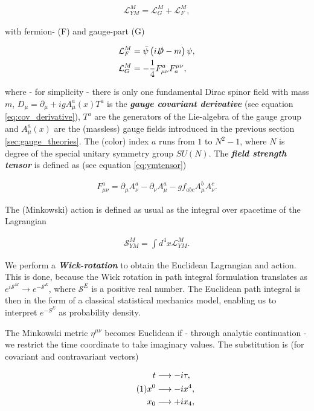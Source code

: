 \documentclass{article}
\newcommand\numberthis{\addtocounter{equation}{1}\tag{\theequation}}
\theoremstyle{plain} %
\theoremstyle{convention} %
\theoremstyle{remark} %
\def\df#1{\textbf{\textit{#1}}}
\numberwithin{equation}{section}
\begin{document}
\begin{align}
    \mathcal{L}_{YM}^M = \mathcal{L}_G^M + \mathcal{L}_F^M, \label{eq:cont_ym_lagrangian}
\end{align}

with fermion- (F) and gauge-part (G)

\begin{align*}
    \mathcal{L}_F^M &= \bar{\psi} \left( i \slashed{D} - m \right) \psi, \\
    \mathcal{L}_G^M &= - \frac{1}{4} F_{\mu \nu}^a F_a^{\mu \nu},
\end{align*}

where - for simplicity - there is only one fundamental Dirac spinor field with mass $m$, $D_{\mu} = \partial_{\mu} + ig A_{\mu}^a(x) T^a$ is the \df{gauge covariant derivative} (see equation \eqref{eq:cov_derivative}), $T^a$ are the generators of the Lie-algebra of the gauge group and $A_{\mu}^a(x)$ are the (massless) gauge fields introduced in the previous section \ref{sec:gauge_theories}. The (color) index $a$ runs from $1$ to $N^2-1$, where $N$ is degree of the special unitary symmetry group $SU(N)$. The \df{field strength tensor} is defined as (see equation \eqref{eq:ymtensor})

\begin{align*}
    F_{\mu \nu}^a = \partial_{\mu} A_{\nu}^a - \partial_{\nu} A_{\mu}^a - g f_{abc} A_{\mu}^b A_{\nu}^c.
\end{align*}

The (Minkowski) action is defined as usual as the integral over spacetime of the Lagrangian

\begin{align*}
    \mathcal{S}_{YM}^M = \int d^4x \mathcal{L}_{YM}^M.
\end{align*}

We perform a \df{Wick-rotation} to obtain the Euclidean Lagrangian and action. This is done, because the Wick rotation in path integral formulation translates as $e^{i \mathcal{S}^M} \to e^{-\mathcal{S}^E}$, where $\mathcal{S}^E$ is a positive real number. The Euclidean path integral is then in the form of a classical statistical mechanics model, enabling us to interpret $e^{-S^E}$ as probability density.

The Minkowski metric $\eta^{\mu \nu}$ becomes Euclidean if - through analytic continuation - we restrict the time coordinate to take imaginary values. The substitution is (for covariant and contravariant vectors)

\begin{align*}
    t &\longrightarrow - i \tau, \\ \numberthis \label{eq:wick}
    x^0 &\longrightarrow - i x^4, \\
    x_0 &\longrightarrow + i x_4,
\end{align*}
\end{document}
